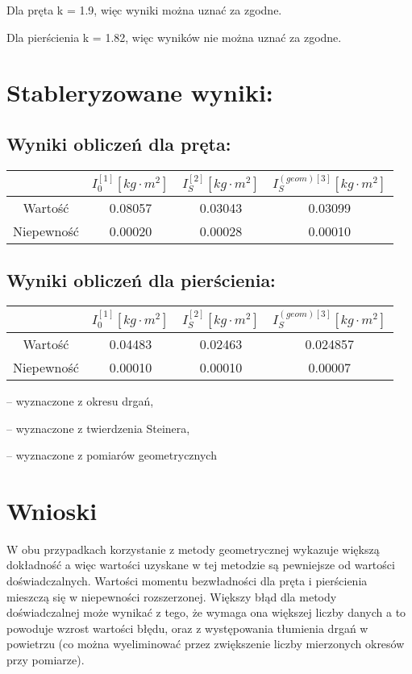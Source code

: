 \documentclass{article}
\begin{document}
    Dla pręta k = 1.9, więc wyniki można uznać za zgodne.
    
    Dla pierścienia k = 1.82, więc wyników nie można uznać za zgodne.
    \pagebreak
    \section{Stableryzowane wyniki:}
    \subsection{Wyniki obliczeń dla pręta:}
    
	\begin{table}[!htb]
        \begin{tabular}{|c|c|c|c|}
        \hline
                & $I_{0}^{[1]}[kg\cdot m^2]$ & $I_{S}^{[2]}[kg\cdot m^2]$  & $I_{S}^{(geom)[3]}[kg\cdot m^2]$  \\ \hline
            Wartość & 0.08057 & 0.03043 & 0.03099 \\ \hline
            Niepewność & 0.00020 & 0.00028 & 0.00010 \\ \hline
        \end{tabular}
    \end{table}
    
    \subsection{Wyniki obliczeń dla pierścienia:}
    
    \begin{table}[!htb]
        \begin{tabular}{|c|c|c|c|}
        \hline
                & $I_{0}^{[1]}[kg\cdot m^2]$ & $I_{S}^{[2]}[kg\cdot m^2]$  & $I_{S}^{(geom)[3]}[kg\cdot m^2]$  \\ \hline
            Wartość & 0.04483 & 0.02463 & 0.024857 \\ \hline
            Niepewność & 0.00010 & 0.00010 & 0.00007 \\ \hline
        \end{tabular}
    \end{table}
    
    \noindent[1] -- wyznaczone z okresu drgań,
    
    \noindent[2] -- wyznaczone z twierdzenia Steinera,
    
    \noindent[3] -- wyznaczone z pomiarów geometrycznych
    
\section{Wnioski}
    W obu przypadkach korzystanie z metody geometrycznej wykazuje większą dokładność a więc wartości uzyskane w tej metodzie są pewniejsze od wartości doświadczalnych. Wartości momentu bezwładności dla pręta i pierścienia mieszczą się w niepewności rozszerzonej. Większy błąd dla metody doświadczalnej może wynikać z tego, że wymaga ona większej liczby danych a to powoduje wzrost wartości błędu, oraz z występowania tłumienia drgań w powietrzu (co można wyeliminować przez zwiększenie liczby mierzonych okresów przy pomiarze). 
\end{document}
